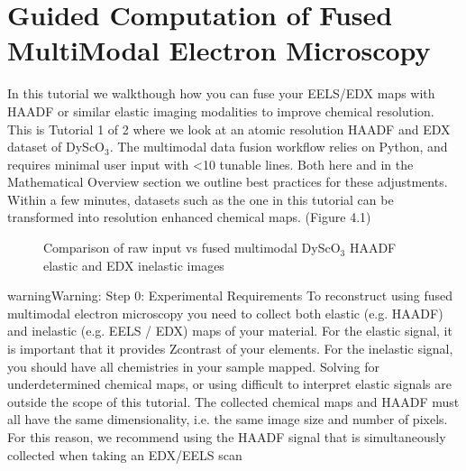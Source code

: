 \documentclass[letterpaper,10pt,english]{jupyterBook}
\let\sphinxpxdimen\pdfpxdimen\else\newdimen\sphinxpxdimen
\begin{document}
\sphinxstepscope


\chapter{Guided Computation of Fused Multi\sphinxhyphen{}Modal Electron Microscopy}
\label{\detokenize{03_multi_modal:guided-computation-of-fused-multi-modal-electron-microscopy}}\label{\detokenize{03_multi_modal::doc}}
\sphinxAtStartPar
In this tutorial we walkthough how you can fuse your EELS/EDX maps with HAADF or similar elastic imaging modalities to improve chemical resolution. This is Tutorial 1 of 2 where we look at an atomic resolution HAADF and EDX dataset of DyScO\(_3\). The multi\sphinxhyphen{}modal data fusion workflow relies on Python, and requires minimal user input with <10 tunable lines. Both here and in the Mathematical Overview section we outline best practices for these adjustments.  Within a few minutes, datasets such as the one in this tutorial can be transformed into resolution enhanced chemical maps. (Figure 4.1)

\begin{figure}[htbp]
\centering
\capstart

\noindent\sphinxincludegraphics[width=700\sphinxpxdimen]{{Figure_3_Output}.png}
\caption{Comparison of raw input vs fused multi\sphinxhyphen{}modal DyScO\(_3\) HAADF elastic and EDX inelastic images}\label{\detokenize{03_multi_modal:raw-vs-fused-dysco-3}}\end{figure}

\begin{sphinxadmonition}{warning}{Warning:}
\sphinxAtStartPar
Step 0: Experimental Requirements
To reconstruct using fused multi\sphinxhyphen{}modal electron microscopy you need to collect both elastic (e.g. HAADF) and inelastic (e.g. EELS / EDX) maps of your material. For the elastic signal, it is important that it provides Z\sphinxhyphen{}contrast of your elements. For the inelastic signal, you should have all chemistries in your sample mapped. Solving for under\sphinxhyphen{}determined chemical maps, or using difficult to interpret elastic signals are outside the scope of this tutorial. The collected chemical maps and HAADF must all have the same dimensionality, i.e. the same image size and number of pixels.  For this reason, we recommend using the HAADF signal that is simultaneously collected when taking an EDX/EELS scan
\end{sphinxadmonition}
\end{document}
